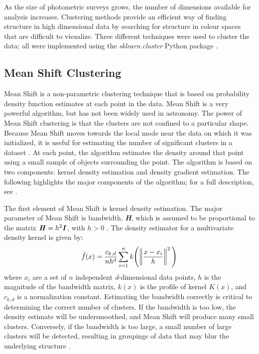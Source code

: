 As the size of photometric surveys grows, the number of dimensions available for analysis increases.
Clustering methods provide an efficient way of finding structure in high dimensional data by searching for structure in colour spaces that are difficult to visualize. 
Three different techniques were used to cluster the data;
all were implemented using the \textit{sklearn.cluster} Python package \citep{sklearn}. %

\subsection{Mean Shift Clustering} 
Mean Shift is a non-parametric clustering technique that is based on probability density function estimates at each point in the data. 
Mean Shift is a very powerful algorithm, but has not been widely used in astronomy. %
The power of Mean Shift clustering is that the clusters are not confined to a particular shape.
Because Mean Shift moves towards the local mode near the data on which it was initialized, it is useful for estimating the number of significant clusters in a dataset \citep{comanciciu02}.
At each point, the algorithm estimates the density around that point using a small sample of objects surrounding the point.
The algorithm is based on two components: kernel density estimation and density gradient estimation.
The following highlights the major components of the algorithm; for a full description, see \citet{vatturi09}.

The first element of Mean Shift is kernel density estimation. 
The major parameter of Mean Shift is bandwidth, \textbf{\textit{H}}, which is assumed to be proportional to the matrix $\textbf{\textit{H}} = h^2\textbf{\textit{I}}$, with $h>0$ \citet{vatturi09}.
The density estimator for a multivariate density kernel is given by: 
\begin{equation} 
\label{eq:ms_de}
\hat{f}(x) = \frac{c_{k,d}}{nh^d} \sum_{i=1}^n k\Bigg( \norm{\frac{x-x_{i}}{h}}^2 \Bigg)
\end{equation}
where $x_i$ are a set of $n$ independent \textit{d}-dimensional data points, $h$ is the magnitude of the bandwidth matrix, $k(x)$ is the profile of kernel $K(x)$, and $c_{k,d}$ is a normalization constant. %
Estimating the bandwidth correctly is critical to determining the correct number of clusters.
If the bandwidth is too low, the density estimate will be undersmoothed, and Mean Shift will produce many small clusters.
Conversely, if the bandwidth is too large, a small number of large clusters will be detected, resulting in groupings of data that may blur the underlying structure \citet{vatturi09}.


